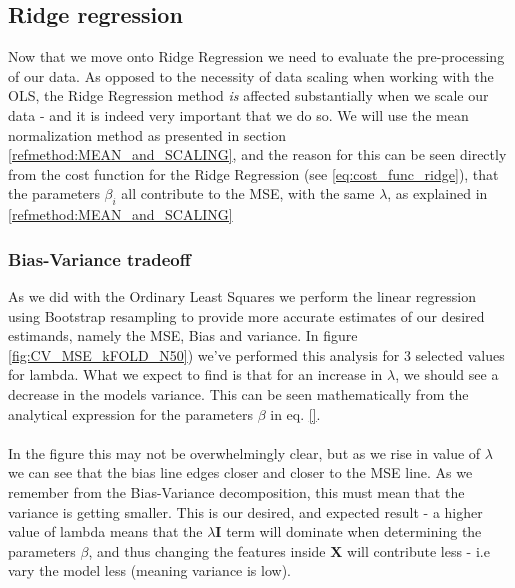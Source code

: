 \documentclass[../main.tex]{subfiles}
\begin{document}
\subsection{Ridge regression}
Now that we move onto Ridge Regression we need to evaluate the pre-processing of our data. As opposed to the necessity of data scaling when working with the OLS, the Ridge Regression method \emph{is} affected substantially when we scale our data - and it is indeed very important that we do so. We will use the mean normalization method as presented in section \eqref{refmethod:MEAN_and_SCALING}, and the reason for this can be seen directly from the cost function for the Ridge Regression (see \eqref{eq:cost_func_ridge}), that the parameters $\beta_i$ all contribute to the MSE, with the same $\lambda$, as explained in \eqref{refmethod:MEAN_and_SCALING}
\subsubsection{Bias-Variance tradeoff}
As we did with the Ordinary Least Squares we perform the linear regression using Bootstrap resampling to provide more accurate estimates of our desired estimands, namely the MSE, Bias and variance. In figure \eqref{fig:CV_MSE_kFOLD_N50}) we've performed this analysis for 3 selected values for lambda. What we expect to find is that for an increase in $\lambda$, we should see a decrease in the models variance. This can be seen mathematically from the analytical expression for the parameters $\beta$ in eq. \eqref{}. \\\\\indent In the figure this may not be overwhelmingly clear, but as we rise in value of $\lambda$ we can see that the bias line edges closer and closer to the MSE line. As we remember from the Bias-Variance decomposition, this must mean that the variance is getting smaller. This is our desired, and expected result - a higher value of lambda means that the $\lambda\mathbf{I}$ term will dominate when determining the parameters $\beta$, and thus changing the features inside $\mathbf{X}$ will contribute less - i.e vary the model less (meaning variance is low).
\end{document}

